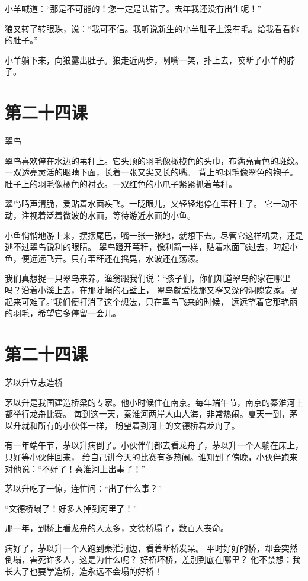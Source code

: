 \documentclass[12pt,UTF8]{ctexbook}
\begin{document}
小羊喊道：“那是不可能的！您一定是认错了。去年我还没有出生呢！”

狼又转了转眼珠，说：“我可不信。我听说新生的小羊肚子上没有毛。给我看看你的肚子。”

小羊躺下来，向狼露出肚子。狼走近两步，咧嘴一笑，扑上去，咬断了小羊的脖子。

\section{第二十四课}

翠鸟

翠鸟喜欢停在水边的苇秆上。它头顶的羽毛像橄榄色的头巾，布满亮青色的斑纹。
一双透亮灵活的眼睛下面，长着一张又尖又长的嘴。
背上的羽毛像翠色的袍子。肚子上的羽毛像橘色的衬衣。一双红色的小爪子紧紧抓着苇秆。

翠鸟鸣声清脆，爱贴着水面疾飞。一眨眼儿，又轻轻地停在苇秆上了。
它一动不动，注视着泛着微波的水面，等待游近水面的小鱼。

小鱼悄悄地游上来，摆摆尾巴，嘴一张一张地，就想下去。尽管它这样机灵，还是逃不过翠鸟锐利的眼睛。
翠鸟蹬开苇秆，像利箭一样，贴着水面飞过去，叼起小鱼，便远远飞开。只有苇秆还在摇晃，水波还在荡漾。

我们真想捉一只翠鸟来养。渔翁跟我们说：“孩子们，你们知道翠鸟的家在哪里吗？沿着小溪上去，在那陡峭的石壁上，
翠鸟就爱找那又窄又深的洞隙安家。捉起来可难了。”我们便打消了这个想法，只在翠鸟飞来的时候，
远远望着它那艳丽的羽毛，希望它多停留一会儿。

\section{第二十四课}

茅以升立志造桥

茅以升是我国建造桥梁的专家。他小时候住在南京。每年端午节，南京的秦淮河上都举行龙舟比赛。
每到这一天，秦淮河两岸人山人海，非常热闹。夏天一到，茅以升就和所有的小伙伴一样，
盼望着到河上的文德桥看龙舟了。

有一年端午节，茅以升病倒了。小伙伴们都去看龙舟了，茅以升一个人躺在床上，只好等小伙伴回来，
给自己讲今天的比赛有多热闹。谁知到了傍晚，小伙伴跑来对他说：“不好了！秦淮河上出事了！”

茅以升吃了一惊，连忙问：“出了什么事？”

“文德桥塌了！好多人掉到河里了！”

那一年，到桥上看龙舟的人太多，文德桥塌了，数百人丧命。

病好了，茅以升一个人跑到秦淮河边，看着断桥发呆。
平时好好的桥，却会突然倒塌，害死许多人，这是为什么呢？
好桥坏桥，差别到底在哪里？
他不禁想：我长大了也要学造桥，造永远不会塌的好桥！
\end{document}
